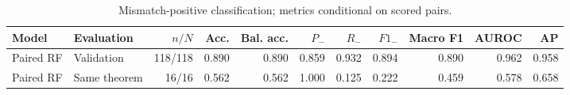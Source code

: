 \begin{table}[htbp]
\centering
\caption{Mismatch-positive classification; metrics conditional on scored pairs.}
\label{tab:forest-metrics}
\small
\begin{adjustbox}{max width=\textwidth}
\begin{tabular}{llrrrrrrrrr}
\toprule
Model & Evaluation & $n/N$ & Acc. & Bal. acc. & $P_-$ & $R_-$ & $F1_-$ & Macro F1 & AUROC & AP \\
\midrule
Paired RF & Validation & 118/118 & 0.890 & 0.890 & 0.859 & 0.932 & 0.894 & 0.890 & 0.962 & 0.958 \\
Paired RF & Same theorem & 16/16 & 0.562 & 0.562 & 1.000 & 0.125 & 0.222 & 0.459 & 0.578 & 0.658 \\
\bottomrule
\end{tabular}
\end{adjustbox}
\end{table}
